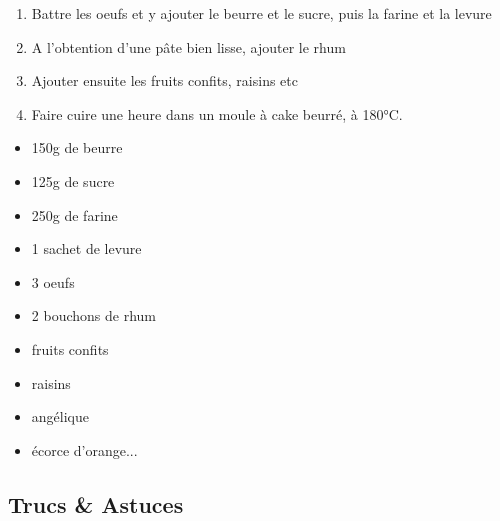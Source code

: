     \begin{minipage}{.7\textwidth}
        \begin{enumerate}
            \item Battre les oeufs et y ajouter le beurre et le sucre, puis la farine et la levure
	    \item A l'obtention d'une pâte bien lisse, ajouter le rhum
	    \item Ajouter ensuite les fruits confits, raisins etc
	    \item Faire cuire une heure dans un moule à cake beurré, à 180°C.

        \end{enumerate}
    \end{minipage}
    \begin{minipage}{.3\textwidth}
        \begin{flushleft}
        \begin{itemize}
            \item 150g de beurre
	    \item 125g de sucre
	    \item 250g de farine
	    \item 1 sachet de levure
	    \item 3 oeufs
	    \item 2 bouchons de rhum
	    \item fruits confits
	    \item raisins
	    \item angélique
	    \item écorce d'orange...

        \end{itemize}
        \end{flushleft}
    \end{minipage}
    
    \vspace{1cm}
    \hline
    \vspace{1cm}
    
    \subsection{Trucs \& Astuces}
        

